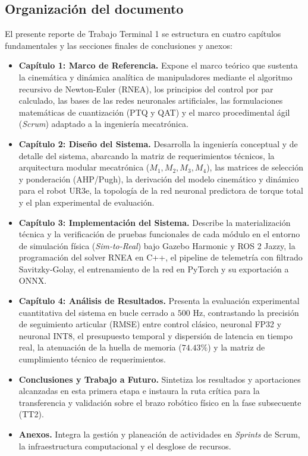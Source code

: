 \documentclass[12pt]{article}
\begin{document}
\subsection*{Organización del documento}
El presente reporte de Trabajo Terminal 1 se estructura en cuatro capítulos fundamentales y las secciones finales de conclusiones y anexos:
\begin{itemize}
    \item \textbf{Capítulo 1: Marco de Referencia.} Expone el marco teórico que sustenta la cinemática y dinámica analítica de manipuladores mediante el algoritmo recursivo de Newton-Euler (RNEA), los principios del control por par calculado, las bases de las redes neuronales artificiales, las formulaciones matemáticas de cuantización (PTQ y QAT) y el marco procedimental ágil (\textit{Scrum}) adaptado a la ingeniería mecatrónica.
    \item \textbf{Capítulo 2: Diseño del Sistema.} Desarrolla la ingeniería conceptual y de detalle del sistema, abarcando la matriz de requerimientos técnicos, la arquitectura modular mecatrónica ($M_1, M_2, M_3, M_4$), las matrices de selección y ponderación (AHP/Pugh), la derivación del modelo cinemático y dinámico para el robot UR3e, la topología de la red neuronal predictora de torque total y el plan experimental de evaluación.
    \item \textbf{Capítulo 3: Implementación del Sistema.} Describe la materialización técnica y la verificación de pruebas funcionales de cada módulo en el entorno de simulación física (\textit{Sim-to-Real}) bajo Gazebo Harmonic y ROS 2 Jazzy, la programación del solver RNEA en C++, el pipeline de telemetría con filtrado Savitzky-Golay, el entrenamiento de la red en PyTorch y su exportación a ONNX.
    \item \textbf{Capítulo 4: Análisis de Resultados.} Presenta la evaluación experimental cuantitativa del sistema en bucle cerrado a $500\text{ Hz}$, contrastando la precisión de seguimiento articular (RMSE) entre control clásico, neuronal FP32 y neuronal INT8, el presupuesto temporal y dispersión de latencia en tiempo real, la atenuación de la huella de memoria ($74.43\%$) y la matriz de cumplimiento técnico de requerimientos.
    \item \textbf{Conclusiones y Trabajo a Futuro.} Sintetiza los resultados y aportaciones alcanzadas en esta primera etapa e instaura la ruta crítica para la transferencia y validación sobre el brazo robótico físico en la fase subsecuente (TT2).
    \item \textbf{Anexos.} Integra la gestión y planeación de actividades en \textit{Sprints} de Scrum, la infraestructura computacional y el desglose de recursos.
\end{itemize}
\end{document}
